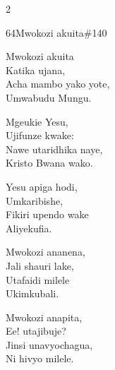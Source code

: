 \documentclass{article}
\begin{document}
\begin{multicols}{2}
\begin{hymn}{64}{Mwokozi akuita}{\#140}
\begin{stanza}
Mwokozi akuita\\
Katika ujana,\\
Acha mambo yako yote,\\
Umwabudu Mungu.
\end{stanza}
\begin{chorus}
Mgeukie Yesu,\\
Ujifunze kwake:\\
Nawe utaridhika naye,\\
Kristo Bwana wako.
\end{chorus}
\begin{stanza}
Yesu apiga hodi,\\
Umkaribishe,\\
Fikiri upendo wake\\
Aliyekufia.
\end{stanza}
\begin{stanza}
Mwokozi ananena,\\
Jali shauri lake,\\
Utafaidi milele\\
Ukimkubali.
\end{stanza}
\begin{stanza}
Mwokozi anapita,\\
Ee! utajibuje?\\
Jinsi unavyochagua,\\
Ni hivyo milele.
\end{stanza}
\end{hymn}


\end{multicols}
\end{document}
